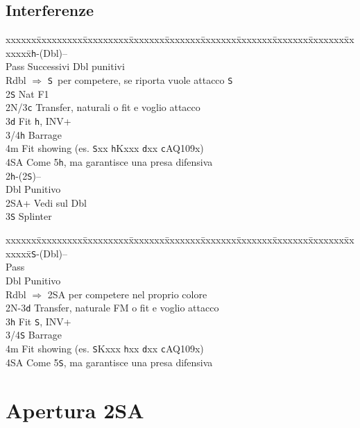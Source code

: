 \documentclass[a4paper,italian]{article}
\newcommand{\BS}{\small{\texttt{S}}}
\newcommand{\BC}{\small{\texttt{c}}}
\newcommand{\BD}{\small{\texttt{d}}}
\newcommand{\BH}{\small{\texttt{h}}}
\newenvironment{bidtable}
{\begin{tabbing}

    xxxxxx\=xxxxxxxxx\=xxxxxxxxx\=xxxxxxx\=xxxxxxx\=xxxxxxx\=xxxxxxx\=xxxxxxx\=xxxxxxx\=xxxxxxx\=\kill}
{\end{tabbing} }%
\begin{document}
\begin{multicols*}{2}
    \subsection{Interferenze}

    \begin{bidtable}
        2\BH-(Dbl)--\+\\
        Pass\> Successivi Dbl punitivi\\
        Rdbl\> $\Rightarrow$ \BS\ per competere, se riporta vuole attacco \BS\\
        2\BS\> Nat F1\\
        2N/3\BC\> Transfer, naturali o fit e voglio attacco\\
        3\BD\> Fit \BH, INV+\\
        3/4\BH\> Barrage\\
        4m\> Fit showing (es. \BS xx \BH Kxxx \BD xx \BC AQ109x)\\
        4\small{SA}\> Come 5\BH, ma garantisce una presa difensiva\-\\
        2\BH-(2\BS)--\+\\
        Dbl\> Punitivo\\
        2\small{SA}+\> Vedi sul Dbl\\
        3\BS\> Splinter\\
    \end{bidtable}

    \begin{bidtable}
        2\BS-(Dbl)--\+\\
        Pass\+\\
        Dbl\> Punitivo\-\\
        Rdbl\> $\Rightarrow$ 2\small{SA} per competere nel proprio colore\\
        2N-3\BD\> Transfer, naturale FM o fit e voglio attacco\\
        3\BH\> Fit \BS, INV+\\
        3/4\BS\> Barrage\\
        4m\> Fit showing (es. \BS Kxxx \BH xx \BD xx \BC AQ109x)\\
        4\small{SA}\> Come 5\BS, ma garantisce una presa difensiva\\
    \end{bidtable}

\end{multicols*}

\pagebreak

\section{Apertura 2{SA}}
\end{document}
